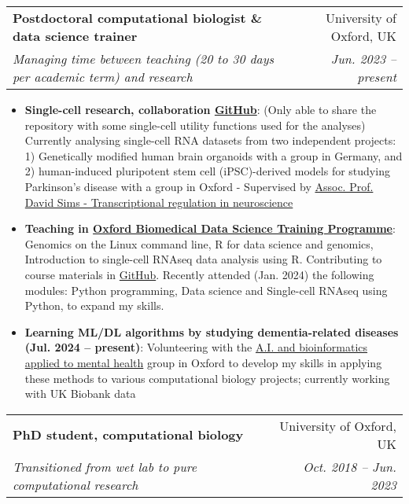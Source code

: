 \documentclass[a4paper,11pt]{article}
\makeatletter
\newcommand{\resumeItem}[2]{
  \item\small{
    \textbf{#1}{: #2 \vspace{-2pt}}
  }
}
\newcommand{\resumeSubheading}[4]{
  \vspace{-1pt}\item
    \begin{tabular*}{0.97\textwidth}[t]{l@{\extracolsep{\fill}}r}
      \textbf{#1} & #2 \\
      \textit{\small#3} & \textit{\small #4} \\
    \end{tabular*}\vspace{-5pt}
}
\newcommand{\resumeItemListStart}{\begin{itemize}}
\newcommand{\resumeItemListEnd}{\end{itemize}\vspace{-5pt}}
\makeatother
\begin{document}
        \resumeSubheading
        {Postdoctoral computational biologist \& data science trainer}{University of Oxford, UK}{Managing time between teaching (20 to 30 days per academic term) and research}{Jun. 2023 -- present}
            \resumeItemListStart
                \resumeItem{Single-cell research, collaboration \href{https://github.com/liezeltamon/utils/tree/main/R}{GitHub}} {(Only able to share the repository with some single-cell utility functions used for the analyses) Currently analysing single-cell RNA datasets from two independent projects: 1) Genetically modified human brain organoids with a group in Germany, and 2) human-induced pluripotent stem cell (iPSC)-derived models for studying Parkinson's disease with a group in Oxford - Supervised by \href{https://www.rdm.ox.ac.uk/people/david-sims}{Assoc. Prof. David Sims - Transcriptional regulation in neuroscience}}
                \resumeItem{Teaching in \href{https://www.imm.ox.ac.uk/research/units-and-centres/mrc-wimm-centre-for-computational-biology/training/oxford-biomedical-data-science-training-programme}{Oxford Biomedical Data Science Training Programme}}{Genomics on the Linux command line, R for data science and genomics, Introduction to single-cell RNAseq data analysis using R. Contributing to course materials in {\href{https://github.com/kevinrue/OBDS_slides}{GitHub}}. Recently attended (Jan. 2024) the following modules: Python programming, Data science and Single-cell RNAseq using Python, to expand my skills.}
                 \resumeItem{Learning ML/DL algorithms by studying dementia-related diseases (Jul. 2024 -- present)}{Volunteering with the \href{https://www.psych.ox.ac.uk/team/alejo-nevado-holgado}{A.I. and bioinformatics applied to mental health} group in Oxford to develop my skills in applying these methods to various computational biology projects; currently working with UK Biobank data}
            \resumeItemListEnd
        \resumeSubheading
        {PhD student, computational biology}{University of Oxford, UK}{Transitioned from wet lab to pure computational research}{Oct. 2018 -- Jun. 2023}
\end{document}
